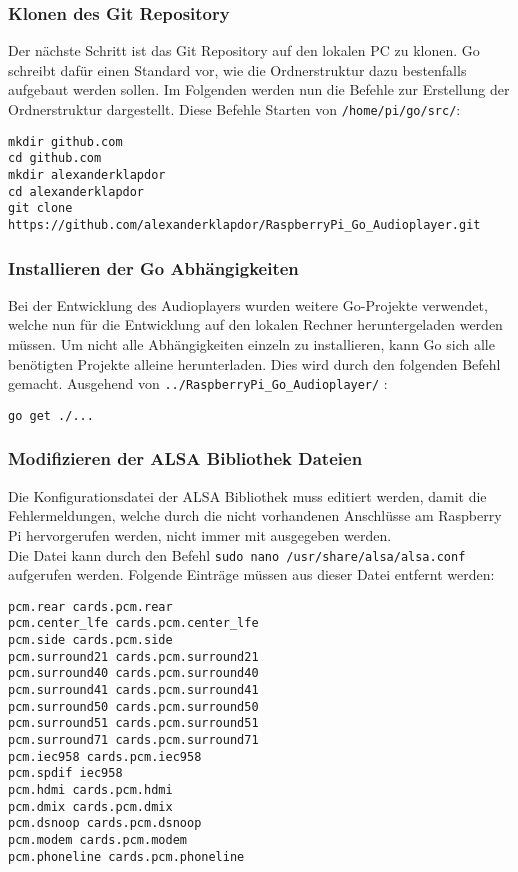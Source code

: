 \begin{enumerate}
\end{enumerate}

\subsubsection{Klonen des Git Repository}
Der nächste Schritt ist das Git Repository auf den lokalen PC zu klonen. Go
schreibt dafür einen Standard vor, wie die Ordnerstruktur dazu bestenfalls
aufgebaut werden sollen. Im Folgenden werden nun die Befehle zur Erstellung der
Ordnerstruktur dargestellt. Diese Befehle Starten von \verb|/home/pi/go/src/|:
\newpage
\begin{lstlisting}[caption={Klonen des Git Repository}]
mkdir github.com 
cd github.com
mkdir alexanderklapdor
cd alexanderklapdor
git clone https://github.com/alexanderklapdor/RaspberryPi_Go_Audioplayer.git
\end{lstlisting}

\subsubsection{Installieren der Go Abhängigkeiten}
Bei der Entwicklung des Audioplayers wurden weitere Go-Projekte verwendet,
welche nun für die Entwicklung auf den lokalen Rechner heruntergeladen werden
müssen. Um nicht alle Abhängigkeiten einzeln zu installieren, kann Go sich alle
benötigten Projekte alleine herunterladen. Dies wird durch den folgenden Befehl
gemacht.
Ausgehend von \verb|../RaspberryPi_Go_Audioplayer/| :
\begin{lstlisting}[caption={Installieren von Go Abhängigkeiten}]
go get ./... 
\end{lstlisting}

\subsubsection{Modifizieren der \acs{ALSA} Bibliothek Dateien}
Die Konfigurationsdatei der \acf{ALSA} Bibliothek muss editiert werden, damit die
Fehlermeldungen, welche durch die nicht vorhandenen Anschlüsse am Raspberry Pi
hervorgerufen werden, nicht immer mit ausgegeben werden. \\
Die Datei kann durch den Befehl \verb|sudo nano /usr/share/alsa/alsa.conf| aufgerufen werden. \newline
Folgende Einträge müssen aus dieser Datei entfernt werden:
\begin{lstlisting}[caption={Liste der zu löschenden Einträge}]
pcm.rear cards.pcm.rear 
pcm.center_lfe cards.pcm.center_lfe 
pcm.side cards.pcm.side 
pcm.surround21 cards.pcm.surround21 
pcm.surround40 cards.pcm.surround40 
pcm.surround41 cards.pcm.surround41 
pcm.surround50 cards.pcm.surround50 
pcm.surround51 cards.pcm.surround51 
pcm.surround71 cards.pcm.surround71 
pcm.iec958 cards.pcm.iec958 
pcm.spdif iec958 
pcm.hdmi cards.pcm.hdmi 
pcm.dmix cards.pcm.dmix 
pcm.dsnoop cards.pcm.dsnoop 
pcm.modem cards.pcm.modem 
pcm.phoneline cards.pcm.phoneline
\end{lstlisting}

